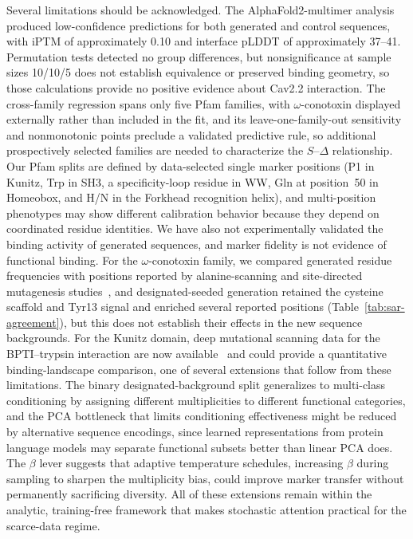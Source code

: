 Several limitations should be acknowledged. The AlphaFold2-multimer analysis produced
low-confidence predictions for both generated and control sequences, with iPTM of
approximately 0.10 and interface pLDDT of approximately 37--41. Permutation tests detected no
group differences, but nonsignificance at sample sizes 10/10/5 does not establish equivalence
or preserved binding geometry, so those calculations provide no positive evidence about Cav2.2
interaction. The cross-family regression spans only five Pfam families, with
$\omega$-conotoxin displayed externally rather than included in the fit, and its
leave-one-family-out sensitivity and nonmonotonic points preclude a validated predictive rule,
so additional prospectively selected families are needed to characterize the
$S$--$\Delta$ relationship. Our Pfam splits are defined by data-selected single marker
positions (P1 in Kunitz, Trp in SH3, a specificity-loop residue in WW, Gln at position~50 in
Homeobox, and H/N in the Forkhead recognition helix), and multi-position phenotypes may show
different calibration behavior because they depend on coordinated residue identities. We have
also not experimentally validated the binding activity of generated sequences, and marker
fidelity is not evidence of functional binding. For the $\omega$-conotoxin family, we compared
generated residue frequencies with positions reported by alanine-scanning and site-directed
mutagenesis studies~\cite{kimTyr13Essential1995,satoBasicResidues1993,lewisConotoxinSAR2012},
and designated-seeded generation retained the cysteine scaffold and Tyr13 signal and enriched
several reported positions (Table~\ref{tab:sar-agreement}), but this does not establish their
effects in the new sequence backgrounds. For the Kunitz domain, deep mutational scanning data
for the BPTI--trypsin interaction are now available~\cite{heyneBPTIDMS2021} and could provide
a quantitative binding-landscape comparison, one of several extensions that follow from these
limitations. The binary
designated-background split generalizes to multi-class conditioning by assigning different
multiplicities to different functional categories, and the PCA bottleneck that limits
conditioning effectiveness might be reduced by alternative sequence encodings, since learned
representations from protein language models may separate functional subsets better than
linear PCA does. The $\beta$ lever suggests that adaptive temperature schedules, increasing
$\beta$ during sampling to sharpen the multiplicity bias, could improve marker transfer
without permanently sacrificing diversity. All of these extensions remain within the analytic,
training-free framework that makes stochastic attention practical for the scarce-data regime.
